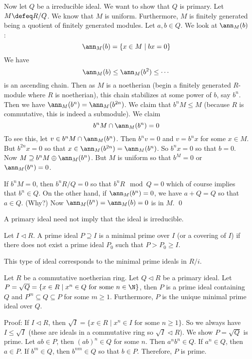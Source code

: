 Now let $Q$ be a irreducible ideal. We want to show that $Q$ is primary. Let $M \defeq R/Q$. We know that $M$ is uniform. Furthermore, $M$ is finitely generated being a quotient of finitely generated modules. Let $a,b \in Q$. We look at $\ann_M(b)$:
\[
\ann_M(b)=\{x \in M\;|\; bx=0\}
\]
We have
\[
\ann_M(b) \leq \ann_M(b^2) \leq \cdots
\]
is an ascending chain. Then as $M$ is a noetherian (begin a finitely generated $R$-module where $R$ is noetherian), this chain stabilizes at some power of $b$, say $b^n$. Then we have $\ann_M(b^n)=\ann_M(b^{2n})$. We claim that $b^nM \leq M$ (because $R$ is commutative, this is indeed a submodule). We claim
\[
b^nM \cap \ann_M(b^n)=0
\]
To see this, let $v \in b^nM \cap \ann_M(b^n)$. Then $b^nv=0$ and $v=b^nx$ for some $x \in M$. But $b^{2n}x=0$ so that $x \in \ann_M(b^{2n})=\ann_M(b^n)$. So $b^nx=0$ so that $b=0$. Now $M \supseteq b^nM \oplus \ann_M(b^n)$. But $M$ is uniform so that $b^M=0$ or $\ann_M(b^n)=0$. 

If $b^nM=0$, then $b^nR/Q=0$ so that $b^nR \mod Q=0$ which of course implies that $b^n \in Q$. On the other hand, if $\ann_M(b^n)=0$, we have $a+Q=Q$ so that $a \in Q$. (Why?) Now $\ann_M(b^n)=\ann_M(b)=0$ is in $M$. \qed \\

\begin{rem}
A primary ideal need not imply that the ideal is irreducible. 
\end{rem}

\begin{dfn}
Let $I \lhd R$. A prime ideal $P \supseteq I$ is a minimal prime over $I$ (or a covering of $I$) if there does not exist a prime ideal $P_0$ such that $P>P_0 \geq I$. 
\end{dfn}

\begin{rem}
This type of ideal corresponds to the minimal prime ideals in $R/i$.
\end{rem}

\begin{lem}
Let $R$ be a commutative noetherian ring. Let $Q \lhd R$ be a primary ideal. Let $P=\sqrt{Q}=\{x\in R\;|\;x^n \in Q\text{ for some }n \in \N\}$, then $P$ is a prime ideal containing $Q$ and $P^m \subseteq Q \subseteq P$ for some $m \geq 1$. Furthermore, $P$ is the unique minimal prime ideal over $Q$.
\end{lem}

Proof: If $I \lhd R$, then $\sqrt{I}=\{x\in R\;|\; x^n \in I \text{ for some }n\geq 1\}$. So we always have $I \leq \sqrt{I}$ (these are ideals in a commutative ring so $\sqrt{I} \lhd R$). We show $P=\sqrt{Q}$ is prime. Let $ab \in P$, then $(ab)^n \in Q$ for some $n$. Then $a^nb^n \in Q$. If $a^n \in Q$, then $a \in P$. If $b^m \in Q$, then $b^{nm} \in Q$ so that $b \in P$. Therefore, $P$ is prime.

